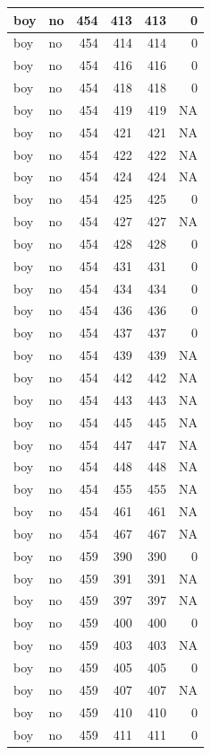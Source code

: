 \documentclass[man]{apa6}
\begin{document}
\begin{tabular}{l|l|r|r|r|r}
\hline
boy & no & 454 & 413 & 413 & 0\\
\hline
boy & no & 454 & 414 & 414 & 0\\
\hline
boy & no & 454 & 416 & 416 & 0\\
\hline
boy & no & 454 & 418 & 418 & 0\\
\hline
boy & no & 454 & 419 & 419 & NA\\
\hline
boy & no & 454 & 421 & 421 & NA\\
\hline
boy & no & 454 & 422 & 422 & NA\\
\hline
boy & no & 454 & 424 & 424 & NA\\
\hline
boy & no & 454 & 425 & 425 & 0\\
\hline
boy & no & 454 & 427 & 427 & NA\\
\hline
boy & no & 454 & 428 & 428 & 0\\
\hline
boy & no & 454 & 431 & 431 & 0\\
\hline
boy & no & 454 & 434 & 434 & 0\\
\hline
boy & no & 454 & 436 & 436 & 0\\
\hline
boy & no & 454 & 437 & 437 & 0\\
\hline
boy & no & 454 & 439 & 439 & NA\\
\hline
boy & no & 454 & 442 & 442 & NA\\
\hline
boy & no & 454 & 443 & 443 & NA\\
\hline
boy & no & 454 & 445 & 445 & NA\\
\hline
boy & no & 454 & 447 & 447 & NA\\
\hline
boy & no & 454 & 448 & 448 & NA\\
\hline
boy & no & 454 & 455 & 455 & NA\\
\hline
boy & no & 454 & 461 & 461 & NA\\
\hline
boy & no & 454 & 467 & 467 & NA\\
\hline
boy & no & 459 & 390 & 390 & 0\\
\hline
boy & no & 459 & 391 & 391 & NA\\
\hline
boy & no & 459 & 397 & 397 & NA\\
\hline
boy & no & 459 & 400 & 400 & 0\\
\hline
boy & no & 459 & 403 & 403 & NA\\
\hline
boy & no & 459 & 405 & 405 & 0\\
\hline
boy & no & 459 & 407 & 407 & NA\\
\hline
boy & no & 459 & 410 & 410 & 0\\
\hline
boy & no & 459 & 411 & 411 & 0\\

\end{tabular}
\end{document}
